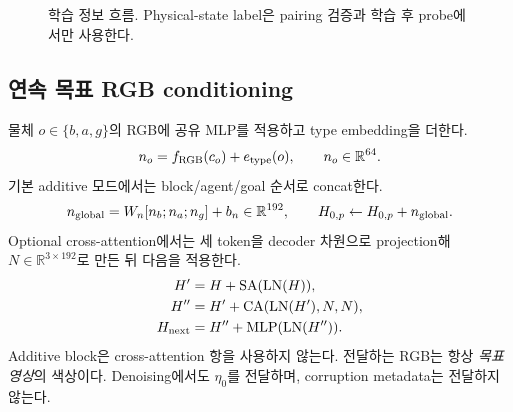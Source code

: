 \documentclass[11pt,a4paper]{article}
\newcommand{\R}{\mathbb{R}}
\begin{document}
\begin{figure}[htbp]\centering
{}
\caption{학습 정보 흐름. Physical-state label은 pairing 검증과 학습 후 probe에서만 사용한다.}
\end{figure}

\subsection{연속 목표 RGB conditioning}
물체 $o\in\{b,a,g\}$의 RGB에 공유 MLP를 적용하고 type embedding을 더한다.
\begin{equation}
n_o=f_{\rm RGB}(c_o)+e_{\rm type}(o),\qquad n_o\in\R^{64}.
\end{equation}
기본 additive 모드에서는 block/agent/goal 순서로 concat한다.
\begin{equation}
n_{\rm global}=W_n[n_b;n_a;n_g]+b_n\in\R^{192},\qquad
H_{0,p}\leftarrow H_{0,p}+n_{\rm global}.
\end{equation}
Optional cross-attention에서는 세 token을 decoder 차원으로 projection해
$N\in\R^{3\times192}$로 만든 뒤 다음을 적용한다.
\begin{align}
H'&=H+\operatorname{SA}(\operatorname{LN}(H)),\\
H''&=H'+\operatorname{CA}(\operatorname{LN}(H'),N,N),\\
H_{\rm next}&=H''+\operatorname{MLP}(\operatorname{LN}(H'')).
\end{align}
Additive block은 cross-attention 항을 사용하지 않는다. 전달하는 RGB는 항상
\emph{목표 영상}의 색상이다. Denoising에서도 $\eta_0$를 전달하며, corruption
metadata는 전달하지 않는다.
\end{document}
